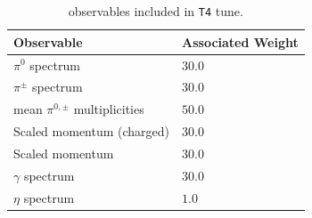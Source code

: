 \documentclass[aps,preprint,floatfix,nofootinbib,showpacs]{revtex4-1}
\begin{document}
 \begin{table}[tbp]
  \begin{center}
   \begin{tabular}{l|l}
    \hline 
    \hline
    Observable  \hspace{3cm} &  \hspace{1cm} Associated Weight \\ \hline
    $\pi^0$ spectrum & \hspace{3cm} $30.0$ \\ \hline
    $\pi^\pm$ spectrum & \hspace{3cm} $30.0$ \\ \hline
    mean $\pi^{0,\pm}$ multiplicities & \hspace{3cm} $50.0$ \\ \hline
    Scaled momentum (charged) & \hspace{3cm} $30.0$ \\ \hline
    Scaled momentum & \hspace{3cm} $30.0$ \\ \hline
    $\gamma$ spectrum & \hspace{3cm} $30.0$ \\ \hline
    $\eta$ spectrum & \hspace{3cm} $1.0$ \\ \hline \hline
   \end{tabular}
  \end{center}
  \caption{observables included in \texttt{T4} tune.}
  \label{Tab6}
\end{table}
\end{document}
